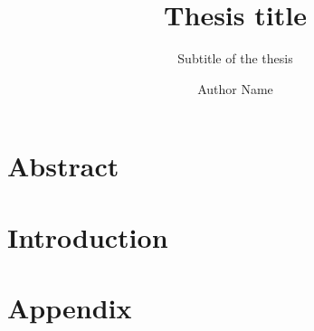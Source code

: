 \documentclass[
  a4paper,            %
  thesis=phd,         %
  english,            %
]{tumbook}
\title{Thesis title}
\subtitle{Subtitle of the thesis}
\author{Author Name}
\begin{document}
\frontmatter
\maketitle
\chapter{Abstract}

\tableofcontents

\mainmatter
\chapter{Introduction}


\appendix
\chapter{Appendix}
\lipsum[4]

% 
\end{document}
